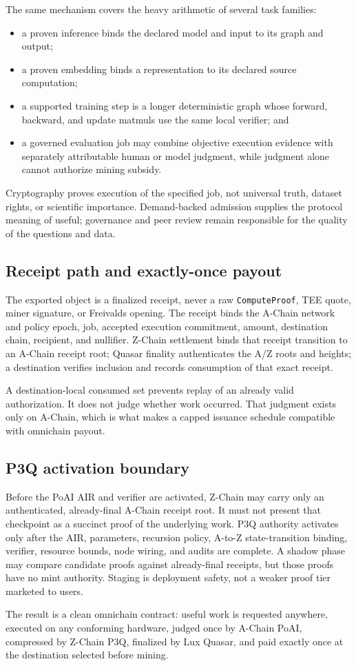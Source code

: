 The same mechanism covers the heavy arithmetic of several task families:

\begin{itemize}[leftmargin=1.4em]
\item a proven inference binds the declared model and input to its graph and output;
\item a proven embedding binds a representation to its declared source computation;
\item a supported training step is a longer deterministic graph whose forward, backward,
and update matmuls use the same local verifier; and
\item a governed evaluation job may combine objective execution evidence with separately
attributable human or model judgment, while judgment alone cannot authorize mining subsidy.
\end{itemize}

Cryptography proves execution of the specified job, not universal truth, dataset rights,
or scientific importance. Demand-backed admission supplies the protocol meaning of useful;
governance and peer review remain responsible for the quality of the questions and data.

\subsection{Receipt path and exactly-once payout}

The exported object is a finalized receipt, never a raw \texttt{ComputeProof}, TEE quote,
miner signature, or Freivalds opening. The receipt binds the A-Chain network and policy
epoch, job, accepted execution commitment, amount, destination chain, recipient, and
nullifier. Z-Chain settlement binds that receipt transition to an A-Chain receipt root;
Quasar finality authenticates the A/Z roots and heights; a destination verifies inclusion
and records consumption of that exact receipt.

A destination-local consumed set prevents replay of an already valid authorization. It
does not judge whether work occurred. That judgment exists only on A-Chain, which is what
makes a capped issuance schedule compatible with omnichain payout.

\subsection{P3Q activation boundary}

Before the PoAI AIR and verifier are activated, Z-Chain may carry only an authenticated,
already-final A-Chain receipt root. It must not present that checkpoint as a succinct proof
of the underlying work. P3Q authority activates only after the AIR, parameters, recursion
policy, A-to-Z state-transition binding, verifier, resource bounds, node wiring, and audits
are complete. A shadow phase may compare candidate proofs against already-final receipts,
but those proofs have no mint authority. Staging is deployment safety, not a weaker proof
tier marketed to users.

The result is a clean omnichain contract: useful work is requested anywhere, executed on
any conforming hardware, judged once by A-Chain PoAI, compressed by Z-Chain P3Q, finalized
by Lux Quasar, and paid exactly once at the destination selected before mining.
